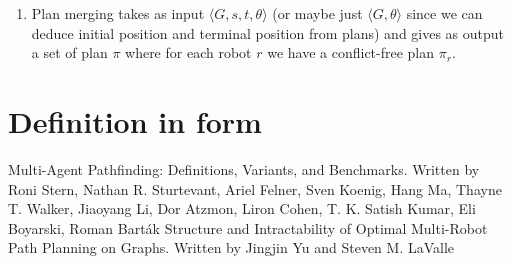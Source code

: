 \documentclass{llncs}
\begin{document}
\begin{enumerate}
    
    \item Plan merging takes as input \(\langle G,s,t, \theta \rangle \) (or maybe just \(\langle G,\theta \rangle \) since we can deduce initial position and terminal position from plans) and gives as output a set of plan \(\pi\) where for each robot \(r\) we have a conflict-free plan \(\pi_r\).
\end{enumerate}



\section{Definition in form}





\newpage
\begin{thebibliography}{2}
Multi-Agent Pathfinding: Definitions, Variants, and Benchmarks. Written by Roni Stern, Nathan R. Sturtevant, Ariel Felner, Sven Koenig, Hang Ma, Thayne T. Walker, Jiaoyang Li, Dor Atzmon, Liron Cohen, T. K. Satish Kumar, Eli Boyarski, Roman Barták
Structure and Intractability of Optimal Multi-Robot Path Planning on Graphs. Written by Jingjin Yu and Steven M. LaValle

\end{thebibliography}
\end{document}
